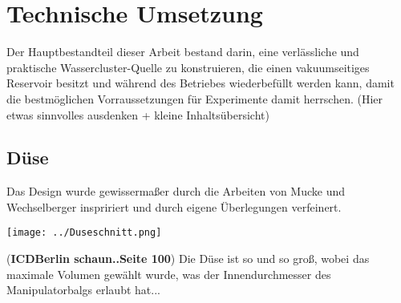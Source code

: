 \chapter{Technische Umsetzung} 

Der Hauptbestandteil dieser Arbeit bestand darin, eine verlässliche und praktische Wassercluster-Quelle zu konstruieren, die einen vakuumseitiges Reservoir besitzt und während des Betriebes wiederbefüllt werden kann, damit die bestmöglichen Vorraussetzungen für Experimente damit herrschen. (Hier etwas sinnvolles ausdenken + kleine Inhaltsübersicht)

\section{Düse}

Das Design wurde gewissermaßer durch die Arbeiten von Mucke \cite{mucke2011} und Wechselberger \cite{wechselberger2014} inspririert und durch eigene Überlegungen verfeinert.

\begin{center}
\begin{minipage}{\linewidth}
\centering
\texttt{[image: ../Duseschnitt.png]}%
 \label{fig:QuerschnittDuse}
\end{minipage} 
\end{center} 

(\textbf{ICDBerlin schaun..Seite 100})
Die Düse ist so und so groß, wobei das maximale Volumen gewählt wurde, was der Innendurchmesser des Manipulatorbalgs erlaubt hat...

